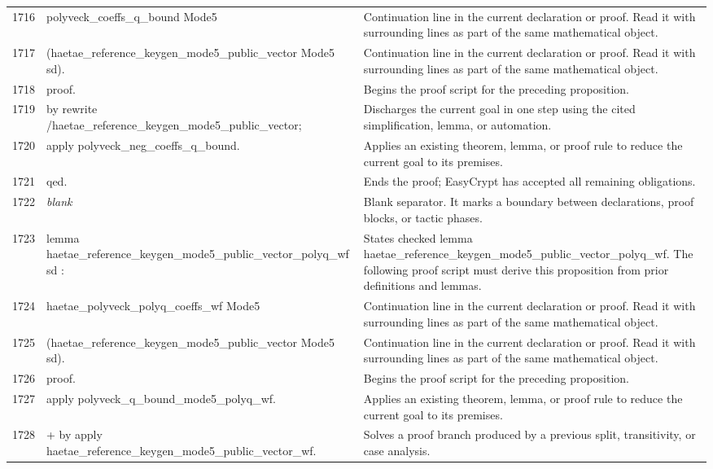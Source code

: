\documentclass[10pt]{article}
\begin{document}
\begin{longtable}{r L{0.53\textwidth} L{0.37\textwidth}}
1716 & {\ttfamily\scriptsize   polyveck\_coeffs\_q\_bound Mode5} & Continuation line in the current declaration or proof.  Read it with surrounding lines as part of the same mathematical object. \\
1717 & {\ttfamily\scriptsize     (haetae\_reference\_keygen\_mode5\_public\_vector Mode5 sd).} & Continuation line in the current declaration or proof.  Read it with surrounding lines as part of the same mathematical object. \\
1718 & {\ttfamily\scriptsize proof.} & Begins the proof script for the preceding proposition. \\
1719 & {\ttfamily\scriptsize by rewrite /haetae\_reference\_keygen\_mode5\_public\_vector;} & Discharges the current goal in one step using the cited simplification, lemma, or automation. \\
1720 & {\ttfamily\scriptsize    apply polyveck\_neg\_coeffs\_q\_bound.} & Applies an existing theorem, lemma, or proof rule to reduce the current goal to its premises. \\
1721 & {\ttfamily\scriptsize qed.} & Ends the proof; EasyCrypt has accepted all remaining obligations. \\
1722 & {\ttfamily\scriptsize \emph{blank}} & Blank separator.  It marks a boundary between declarations, proof blocks, or tactic phases. \\
1723 & {\ttfamily\scriptsize lemma haetae\_reference\_keygen\_mode5\_public\_vector\_polyq\_wf sd :} & States checked lemma haetae\_reference\_keygen\_mode5\_public\_vector\_polyq\_wf.  The following proof script must derive this proposition from prior definitions and lemmas. \\
1724 & {\ttfamily\scriptsize   haetae\_polyveck\_polyq\_coeffs\_wf Mode5} & Continuation line in the current declaration or proof.  Read it with surrounding lines as part of the same mathematical object. \\
1725 & {\ttfamily\scriptsize     (haetae\_reference\_keygen\_mode5\_public\_vector Mode5 sd).} & Continuation line in the current declaration or proof.  Read it with surrounding lines as part of the same mathematical object. \\
1726 & {\ttfamily\scriptsize proof.} & Begins the proof script for the preceding proposition. \\
1727 & {\ttfamily\scriptsize apply polyveck\_q\_bound\_mode5\_polyq\_wf.} & Applies an existing theorem, lemma, or proof rule to reduce the current goal to its premises. \\
1728 & {\ttfamily\scriptsize + by apply haetae\_reference\_keygen\_mode5\_public\_vector\_wf.} & Solves a proof branch produced by a previous split, transitivity, or case analysis. \\

\end{longtable}
\end{document}
